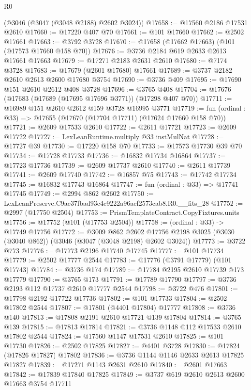 \begin{lexlean}{R0}
\begin{coremodule}
    (@3046 (@3047 (@3048 @2188) @2602 @3024))
@17658 := @17560 @2186 @17531 @2610
@17660 := @17220 @407 @70
@17661 := @101 @17660
@17662 := @2502 @17661
@17663 := @3792 @3728
@17670 := @17658 (@17662 @17663) (@101 (@17573 @17660 @158 @70))
@17676 := @3736 @2184 @619 @2633 @2613 @17661 @17663
@17679 := @17271 @2183 @2631 @2610
@17680 := @7174 @3728
@17683 := @17679 (@2601 @17680) @17661
@17689 := @3737 @2182 @2610 @2613 @2600 @17680 @3754
@17690 := @3736 @409
@17695 := @17690 @151 @2610 @2612 @408 @3728
@17696 := @3765 @408
@17704 := @17676 (@17683 (@17689 (@17695 @17696 @3771)) (@17298 @407 @70))
@17711 := @16989 @151 @2610 @2612 @159 @3728 @16995 @3771
@17719 := fun (ordinal : @33) => @17655 (@17670 (@17704 @17711) (@17624 @17660 @158 @70))
@17721 := @2609 @17533 @2610
@17722 := @2611 @17721
@17723 := @2609 @17722
@17727 := LexLeanRuntime.multiply @33 instMulNat
@17728 := @17727 @39
@17730 := @17220 @158 @70
@17733 := @17573 @17730 @39 @70
@17734 := @17728 @17733
@17736 := @16832 @17734 @16864
@17737 := @17723 @17736
@17739 := @2609 @17737 @2610
@17740 := @2611 @17739
@17741 := @2609 @17740
@17742 := @16857 @75
@17743 := @17742 @17734
@17745 := @16832 @17743 @16864
@17747 := fun (ordinal : @33) => @17741 @17745
@17749 := @2994 @862 @2602
@17750 := LexLeanPreserve.C9ae37fbad93c4c9222a96acf2573cab8.R0.__fits_28
@17752 := @2997 (@17750 @2504)
@17753 := PrismTemplateContract.CopyFixtures.units
@17756 := @17752 (@101 (@17753 @2504))
@17758 := (ordinal : @33) -> @17749 @17756
@17772 := @3009
    @862
    @2602
    @17756
    @2198
    @3025
    (@3030 (@3040 @862))
    (@3046 (@3047 (@3048 @2198) @2602 @3024))
@17773 := @3722 @773
@17776 := @17773 @2196 @17740 @17745
@17777 := @101 @17734
@17779 := @2502 @17777 @2544
@17783 := @17776 (@3791 @17779) (@101 @17743)
@17784 := @3736 @174
@17789 := @17784 @2195 @2610 @17739 @173 @17779
@17790 := @3765 @173
@17791 := @17789 @17790
@17797 := @3736 @2193 @112 @17737 @2610 @17777 @2544
@17798 := @3722 @476
@17801 := @17798 @2192 @17722 @17736
@17802 := @101 @17733
@17804 := @2502 @17802 @2544
@17807 := @17801 (@4401 @17804) @17777
@17808 := @3736 @140
@17813 := @17808 @2191 @2610 @17721 @139 @17804
@17814 := @3765 @139
@17815 := @17813 @17814
@17821 := @3736 @1148 @112 @17533 @2610 @17802 @2544
@17824 := @17560 @1147 @17531 @2610
@17825 := @101 @17730
@17826 := @2502 @17825
@17827 := @4401 @3728
@17830 := @17824 (@17826 @17827) @17802
@17836 := @3736 @1144 @1146 @2633 @2613 @17825 @17827
@17839 := @17271 @1143 @2631 @2610
@17840 := @2601 @17663
@17842 := @17839 @17840 @17825
@17849 := @3737 @619 @2610 @2613 @2600 @17663 @3754 @17711

\end{coremodule}
\end{lexlean}
